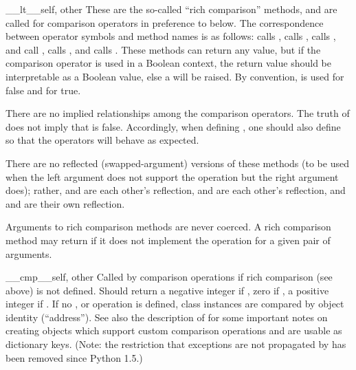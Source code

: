 \begin{methoddesc}[object]{__lt__}{self, other}
These are the so-called ``rich comparison'' methods, and are called
for comparison operators in preference to  below.
The correspondence between operator symbols and method names is as
follows:
 calls ,
 calls ,
 calls ,
 and  call
,
 calls , and
 calls .
These methods can return any value, but if the comparison operator is
used in a Boolean context, the return value should be interpretable as
a Boolean value, else a  will be raised.
By convention,  is used for false and  for true.

There are no implied relationships among the comparison operators.
The truth of  does not imply that 
is false.  Accordingly, when defining , one should also
define  so that the operators will behave as expected.

There are no reflected (swapped-argument) versions of these methods
(to be used when the left argument does not support the operation but
the right argument does); rather,  and
 are each other's reflection,  and
 are each other's reflection, and 
and  are their own reflection.

Arguments to rich comparison methods are never coerced.  A rich
comparison method may return  if it does not
implement the operation for a given pair of arguments.
\end{methoddesc}

\begin{methoddesc}[object]{__cmp__}{self, other}
Called by comparison operations if rich comparison (see above) is not
defined.  Should return a negative integer if ,
zero if , a positive integer if .  If no ,  or
 operation is defined, class instances are compared
by object identity (``address'').  See also the description of
 for some important notes on creating objects which
support custom comparison operations and are usable as dictionary
keys.
(Note: the restriction that exceptions are not propagated by
 has been removed since Python 1.5.)
\end{methoddesc}

